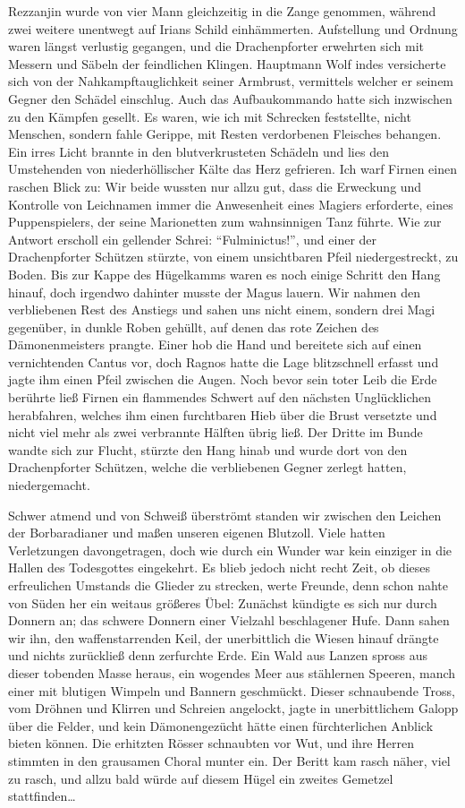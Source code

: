 Rezzanjin wurde von vier Mann gleichzeitig in die Zange genommen, während zwei weitere unentwegt auf Irians Schild einhämmerten. Aufstellung und Ordnung waren längst verlustig gegangen, und die Drachenpforter erwehrten sich mit Messern und Säbeln der feindlichen Klingen. Hauptmann Wolf indes versicherte sich von der Nahkampftauglichkeit seiner Armbrust, vermittels welcher er seinem Gegner den Schädel einschlug. Auch das Aufbaukommando hatte sich inzwischen zu den Kämpfen gesellt. Es waren, wie ich mit Schrecken feststellte, nicht Menschen, sondern fahle Gerippe, mit Resten verdorbenen Fleisches behangen. Ein irres Licht brannte in den blutverkrusteten Schädeln und lies den Umstehenden von niederhöllischer Kälte das Herz gefrieren. Ich warf Firnen einen raschen Blick zu: Wir beide wussten nur allzu gut, dass die Erweckung und Kontrolle von Leichnamen immer die Anwesenheit eines Magiers erforderte, eines Puppenspielers, der seine Marionetten zum wahnsinnigen Tanz führte. Wie zur Antwort erscholl ein gellender Schrei: ``Fulminictus!'', und einer der Drachenpforter Schützen stürzte, von einem unsichtbaren Pfeil niedergestreckt, zu Boden. Bis zur Kappe des Hügelkamms waren es noch einige Schritt den Hang hinauf, doch irgendwo dahinter musste der Magus lauern. Wir nahmen den verbliebenen Rest des Anstiegs und sahen uns nicht einem, sondern drei Magi gegenüber, in dunkle Roben gehüllt, auf denen das rote Zeichen des Dämonenmeisters prangte. Einer hob die Hand und bereitete sich auf einen vernichtenden Cantus vor, doch Ragnos hatte die Lage blitzschnell erfasst und jagte ihm einen Pfeil zwischen die Augen. Noch bevor sein toter Leib die Erde berührte ließ Firnen ein flammendes Schwert auf den nächsten Unglücklichen herabfahren, welches ihm einen furchtbaren Hieb über die Brust versetzte und nicht viel mehr als zwei verbrannte Hälften übrig ließ. Der Dritte im Bunde wandte sich zur Flucht, stürzte den Hang hinab und wurde dort von den Drachenpforter Schützen, welche die verbliebenen Gegner zerlegt hatten, niedergemacht.

Schwer atmend und von Schweiß überströmt standen wir zwischen den Leichen der Borbaradianer und maßen unseren eigenen Blutzoll. Viele hatten Verletzungen davongetragen, doch wie durch ein Wunder war kein einziger in die Hallen des Todesgottes eingekehrt. Es blieb jedoch nicht recht Zeit, ob dieses erfreulichen Umstands die Glieder zu strecken, werte Freunde, denn schon nahte von Süden her ein weitaus größeres Übel: Zunächst kündigte es sich nur durch Donnern an; das schwere Donnern einer Vielzahl beschlagener Hufe. Dann sahen wir ihn, den waffenstarrenden Keil, der unerbittlich die Wiesen hinauf drängte und nichts zurückließ denn zerfurchte Erde. Ein Wald aus Lanzen spross aus dieser tobenden Masse heraus, ein wogendes Meer aus stählernen Speeren, manch einer mit blutigen Wimpeln und Bannern geschmückt. Dieser schnaubende Tross, vom Dröhnen und Klirren und Schreien angelockt, jagte in unerbittlichem Galopp über die Felder, und kein Dämonengezücht hätte einen fürchterlichen Anblick bieten können. Die erhitzten Rösser schnaubten vor Wut, und ihre Herren stimmten in den grausamen Choral munter ein. Der Beritt kam rasch näher, viel zu rasch, und allzu bald würde auf diesem Hügel ein zweites Gemetzel stattfinden\dots 

